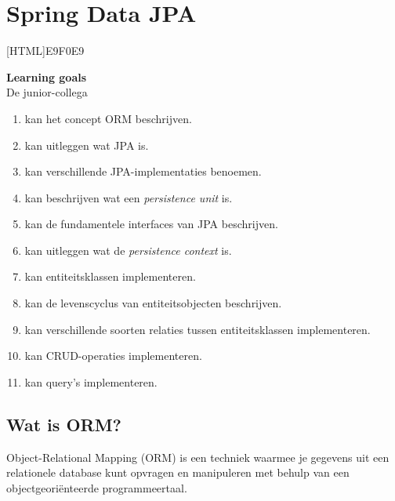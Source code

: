\chapter{Spring Data JPA}

[HTML]{E9F0E9}{\parbox{\textwidth}{%
\noindent \textbf{Learning goals}\\
De junior-collega
\begin{enumerate}[nolistsep]
\item kan het concept ORM beschrijven.
\item kan uitleggen wat JPA is.
\item kan verschillende JPA-implementaties benoemen.
\item kan beschrijven wat een \textit{persistence unit} is.
\item kan de fundamentele interfaces van JPA beschrijven.
\item kan uitleggen wat de \textit{persistence context} is.
\item kan entiteitsklassen implementeren.
\item kan de levenscyclus van entiteitsobjecten beschrijven.
\item kan verschillende soorten relaties tussen entiteitsklassen implementeren.
\item kan CRUD-operaties implementeren.
\item kan query's implementeren.
\end{enumerate}
}}

  
\section{Wat is ORM?}

Object-Relational Mapping (ORM) is een techniek waarmee je gegevens uit een relationele database kunt opvragen en manipuleren met behulp van een objectgeoriënteerde programmeertaal.

